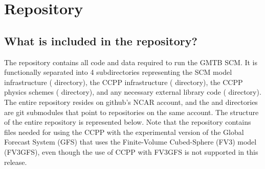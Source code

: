 \chapter{Repository}
\label{chapter: repository}

\section{What is included in the repository?}
The repository contains all code and data required to run the GMTB SCM. It is functionally separated into 4 subdirectories representing the SCM model infrastructure ( directory), the CCPP infrastructure ( directory), the CCPP physics schemes ( directory), and any necessary external library code ( directory). The entire  repository resides on github's NCAR account, and the  and  directories are git submodules that point to repositories on the same account. The structure of the entire repository is represented below. Note that the  repository contains files needed for using the CCPP with the experimental version of the Global Forecast System (GFS) that uses the Finite-Volume Cubed-Sphere (FV3) model (FV3GFS), even though the use of CCPP with FV3GFS is not supported in this release.

